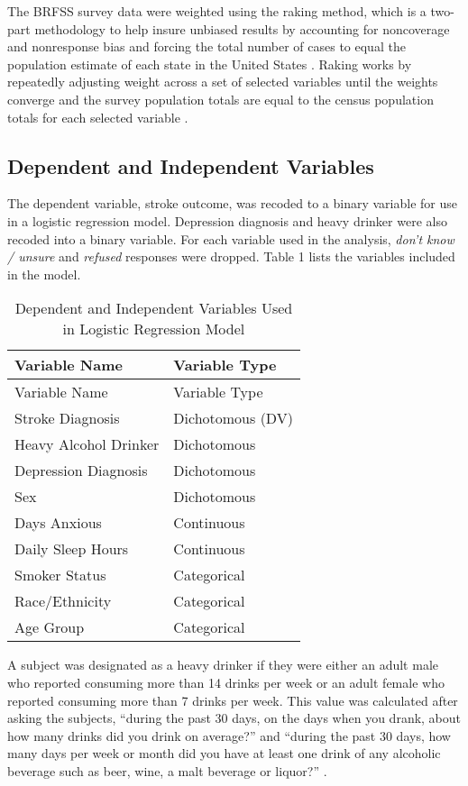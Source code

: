 \documentclass[11pt,]{article}
\begin{document}
The BRFSS survey data were weighted using the raking method, which is a
two-part methodology to help insure unbiased results by accounting for
noncoverage and nonresponse bias and forcing the total number of cases
to equal the population estimate of each state in the United States
\citep{CentersforDiseaseControlandPrevention2007a}. Raking works by
repeatedly adjusting weight across a set of selected variables until the
weights converge and the survey population totals are equal to the
census population totals for each selected variable \citep{Fricker1993}.

\subsection{Dependent and Independent
Variables}\label{dependent-and-independent-variables}

The dependent variable, stroke outcome, was recoded to a binary variable
for use in a logistic regression model. Depression diagnosis and heavy
drinker were also recoded into a binary variable. For each variable used
in the analysis, \emph{don't know / unsure} and \emph{refused} responses
were dropped. Table 1 lists the variables included in the model.

\begin{longtable}[]{@{}ll@{}}
\caption{Dependent and Independent Variables Used in Logistic Regression
Model}\tabularnewline
\toprule
Variable Name & Variable Type\tabularnewline
\midrule
\endfirsthead
\toprule
Variable Name & Variable Type\tabularnewline
\midrule
\endhead
Stroke Diagnosis & Dichotomous (DV)\tabularnewline
Heavy Alcohol Drinker & Dichotomous\tabularnewline
Depression Diagnosis & Dichotomous\tabularnewline
Sex & Dichotomous\tabularnewline
Days Anxious & Continuous\tabularnewline
Daily Sleep Hours & Continuous\tabularnewline
Smoker Status & Categorical\tabularnewline
Race/Ethnicity & Categorical\tabularnewline
Age Group & Categorical\tabularnewline
\bottomrule
\end{longtable}

A subject was designated as a heavy drinker if they were either an adult
male who reported consuming more than 14 drinks per week or an adult
female who reported consuming more than 7 drinks per week. This value
was calculated after asking the subjects, ``during the past 30 days, on
the days when you drank, about how many drinks did you drink on
average?'' and ``during the past 30 days, how many days per week or
month did you have at least one drink of any alcoholic beverage such as
beer, wine, a malt beverage or liquor?''
\citep{CentersforDiseaseControlandPrevention2007}.
\end{document}
